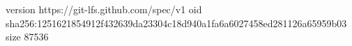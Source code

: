 version https://git-lfs.github.com/spec/v1
oid sha256:1251621854912f432639da23304c18d940a1fa6a6027458ed281126a65959b03
size 87536

